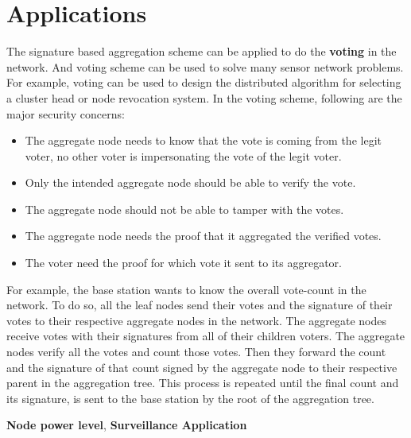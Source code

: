 \section{Applications}
		The signature based aggregation scheme can be applied to do the \textbf{voting} in the network.
		And voting scheme can be used to solve many sensor network problems.
		For example, voting can be used to design the distributed algorithm for selecting a cluster head or node revocation system.
		In the voting scheme, following are the major security concerns: 
		\begin{itemize}
			\item The aggregate node needs to know that the vote is coming from the legit voter, no other voter is impersonating the vote of the legit voter.
			\item Only the intended aggregate node should be able to verify the vote.
			\item The aggregate node should not be able to tamper with the votes. 
			\item The aggregate node needs the proof that it aggregated the verified votes.
			\item The voter need the proof for which vote it sent to its aggregator.
		\end{itemize}
		For example, the base station wants to know the overall vote-count in the network.
		To do so, all the leaf nodes send their votes and the signature of their votes to their respective aggregate nodes in the network.
		The aggregate nodes receive votes with their signatures from all of their children voters.
		The aggregate nodes verify all the votes and count those votes.
		Then they forward the count and the signature of that count signed by the aggregate node to their respective parent in the aggregation tree.
		This process is repeated until the final count and its signature, is sent to the base station by the root of the aggregation tree.
				
	\textbf{Node power level},
	\textbf{Surveillance Application}
